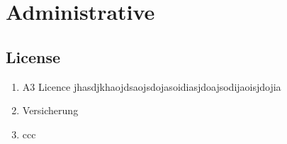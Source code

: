 
\chapter{Administrative}\label{chapter:Administrative}



\section{License}
\begin{enumerate}
    \item A3 Licence
    jhasdjkhaojdsaojsdojasoidiasjdoajsodijaoisjdojia
    \item Versicherung
    \item ccc
  \end{enumerate}


